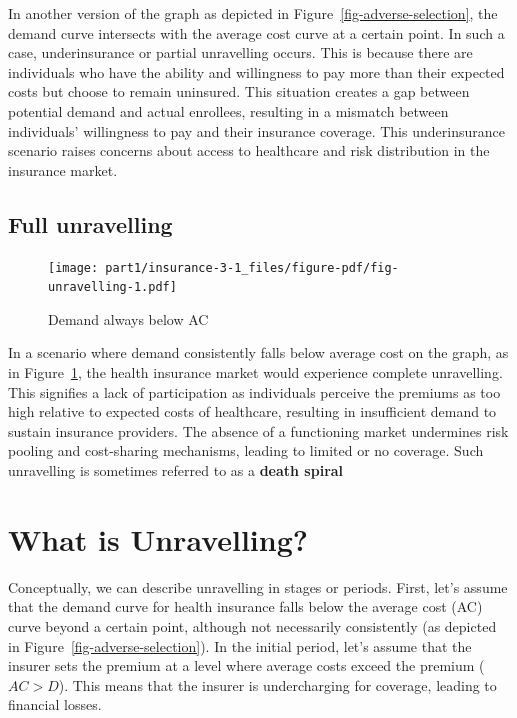 \documentclass[
  letterpaper,
  DIV=11,
  numbers=noendperiod]{scrreport}
\theoremstyle{definition}
\theoremstyle{remark}
\begin{document}
In another version of the graph as depicted in
Figure~\ref{fig-adverse-selection}, the demand curve intersects with the
average cost curve at a certain point. In such a case, underinsurance or
partial unravelling occurs. This is because there are individuals who
have the ability and willingness to pay more than their expected costs
but choose to remain uninsured. This situation creates a gap between
potential demand and actual enrollees, resulting in a mismatch between
individuals' willingness to pay and their insurance coverage. This
underinsurance scenario raises concerns about access to healthcare and
risk distribution in the insurance market.

\hypertarget{full-unravelling}{%
\subsection*{Full unravelling}\label{full-unravelling}}

\begin{figure}

{\centering \texttt{[image: part1/insurance-3-1\_files/figure-pdf/fig-unravelling-1.pdf]}

}

\caption{\label{fig-unravelling}Demand always below AC}

\end{figure}

In a scenario where demand consistently falls below average cost on the
graph, as in Figure~\ref{fig-unravelling}, the health insurance market
would experience complete unravelling. This signifies a lack of
participation as individuals perceive the premiums as too high relative
to expected costs of healthcare, resulting in insufficient demand to
sustain insurance providers. The absence of a functioning market
undermines risk pooling and cost-sharing mechanisms, leading to limited
or no coverage. Such unravelling is sometimes referred to as a
\textbf{death spiral}

\hypertarget{what-is-unravelling}{%
\section{What is Unravelling?}\label{what-is-unravelling}}

Conceptually, we can describe unravelling in stages or periods. First,
let's assume that the demand curve for health insurance falls below the
average cost (AC) curve beyond a certain point, although not necessarily
consistently (as depicted in Figure~\ref{fig-adverse-selection}). In the
initial period, let's assume that the insurer sets the premium at a
level where average costs exceed the premium (\(AC > D\)). This means
that the insurer is undercharging for coverage, leading to financial
losses.
\end{document}
